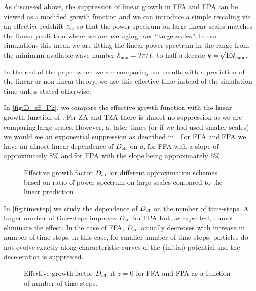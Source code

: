 As discussed above, the suppression of linear growth in FFA and FPA can be viewed as a modified growth function and we can introduce a simple rescaling via an effective redshift $z_\text{\tiny eff}$ so that the power spectrum on large linear scales matches the linear prediction
where we are averaging over ``large scales''. In our simulations this mean we are fitting the linear power spectrum in the range from the minimum available wave-number $k_\text{\tiny min}=2\pi/L$ to half a decade $k=\sqrt{10}k_\text{\tiny min}$.

In the rest of the paper when we are comparing our results with a prediction of the linear or non-linear theory, we use this effective time instead of the simulation time unless stated otherwise.

In \autoref{fig:D_eff_Pk}, we compare the effective growth function with the linear growth function of \LCDM. For ZA and TZA there is almost no suppression as we are comparing large scales. However, at later times (or if we had used smaller scales) we would see an exponential suppression as described in \cite{Bharadwaj_1996}. For FFA and FPA we have an almost linear dependence of $D_\text{\tiny eff}$ on $a$, for FFA with a slope of approximately $8\%$ and for FPA with the slope being approximately $6\%$.
\begin{figure}
  \centering
    
    \begin{subfigure}{\textwidth}
	\end{subfigure}
	\begin{subfigure}{\textwidth}
	\end{subfigure}
  \caption{Effective growth factor $D_\text{\tiny eff}$ for different approximation schemes based on ratio of power spectrum on large scales compared to the linear prediction.}
  \label{fig:D_eff_Pk}
\end{figure}

In \autoref{fig:timestep} we study the dependence of $D_\text{\tiny eff}$ on the number of time-steps. A larger number of time-steps improves $D_\text{\tiny eff}$ for FPA but, as expected, cannot eliminate the effect. In the case of FFA, $D_\text{\tiny eff}$ actually decreases with increase in number of time-steps. In this case, for smaller number of time-steps, particles do not evolve exactly along characteristic curves of the (initial) potential and the deceleration is suppressed.
\begin{figure}
  \centering
    
    \begin{subfigure}{\textwidth}
	\end{subfigure}
	\begin{subfigure}{\textwidth}
	\end{subfigure}
  \caption{Effective growth factor $D_\text{\tiny eff}$ at $z=0$ for FFA and FPA as a function of number of time-steps.}
  \label{fig:timestep}
\end{figure}


